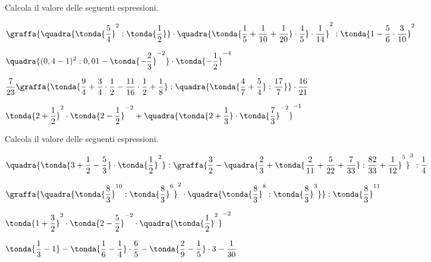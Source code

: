 \begin{esercizio}[*]
\label{ese:3.150}
 Calcola il valore delle seguenti espressioni.
\begin{enumeratees}
\spazielenx
\item \(\displaystyle{\graffa{\quadra{\tonda{\frac{5}{4}}^{2}:
\tonda{\frac{1}{2}}}\cdot%
\quadra{\tonda{\frac{1}{5}+\frac{1}{10}+\frac{1}{20}}\cdot\frac{4}{5}}
\cdot%
\frac{1}{14}}^{2}:\tonda{1-\frac{5}{6}\cdot\frac{3}{10}}^{2}}\)
\item \(\displaystyle{\quadra{(0,4-1)^{2}:0,01-\tonda{-{\frac{2}{3}}}^{-2}
}\cdot
\tonda{-{\frac{1}{2}}}^{-4}}\)
\item \(\displaystyle{\frac{7}{23}\graffa{\tonda{\frac{9}{4}+\frac{3}{4}\cdot
{\frac{1}{2}}-\frac{11}{16}\cdot\frac{1}{2}+\frac{1}{8}}:\quadra{
\tonda{\frac{4}{7}+\frac{5}{4}}:\frac{17}{7}}}\cdot
{\frac{16}{21}}}\)
\item \(\displaystyle{\tonda{2+\frac{1}{2}}^{2} \cdot 
\tonda{2-\frac{1}{2}
}^{-2}+\quadra{\tonda{2+\frac{1}{3}}\cdot
\tonda{\frac{7}{3}}^{-2}}^{-1}}\)
\end{enumeratees}
\end{esercizio}

\begin{esercizio}[*]
\label{ese:3.151}
 Calcola il valore delle seguenti espressioni.
\begin{enumeratees}
\spazielenx
\item \(\displaystyle{\quadra{\tonda{3+\frac{1}{2}-\frac{5}{3}}\cdot
\tonda{\frac{1}{2}}^{2}}:\graffa{\frac{3}{2}-\quadra{\frac{2}{3}+
\tonda{\frac{2}{11}+
\frac{5}{22}+\frac{7}{33}}:\frac{82}{33}+\frac{1}{12}}^{5}
}^{3}:\frac{1}{4}}\)
\item \(\displaystyle{\graffa{\quadra{\tonda{\frac{8}{3}}^{10}:
\tonda{\frac{8}{3}}^{6}}^{2}\cdot
\quadra{\tonda{\frac{8}{3}}^{8}:\tonda{\frac{8}{3}}^{3}}}:
\tonda{\frac{8}{3}}^{11}}\)
\item \(\displaystyle{\tonda{1+\frac{3}{2}}^{2}\cdot
\tonda{2-\frac{5}{2}}^{-2}\cdot
\quadra{\tonda{\frac{1}{2}}^{2}}^{-2}}\)
\item \(\displaystyle{\tonda{\frac{1}{3}-1}-\tonda{\frac{1}{6}-
\frac{1}{4}}\cdot
{\frac{6}{5}}-\tonda{\frac{2}{9}-\frac{1}{5}}\cdot 3-\frac{1}{30}}\)
\end{enumeratees}
\end{esercizio}

